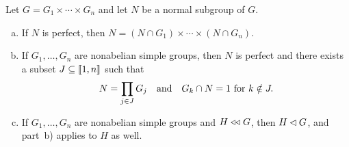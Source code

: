 \begin{thm}\label{semisimple-normal}
    Let\/ $G = G_1 \times \cdots \times G_n$ and let\/ $N$ be a normal subgroup of\/ $G$.
    \begin{enumerate}[a),font=\upshape]
    \item If\/ $N$ is perfect, then\/ $N = (N \cap G_1) \times \cdots \times (N \cap G_n)$.
    \item If\/ $G_1, \dots, G_n$ are nonabelian simple groups, then\/ $N$ is perfect and there exists a subset\/ $J \subseteq \llbracket1,n\rrbracket$ such that
    $$
        N = \prod_{j \in J} G_j\quad\text{\upshape and}\quad G_k \cap N = 1\text{\upshape\ for }k \notin J.
    $$
    \item If\/ $G_1, \dots, G_n$ are nonabelian simple groups and\/ $H\mathrel{\triangleleft\triangleleft} G$, then\/ $H\lhd G$, and part\/~{\upshape b)} applies to\/ $H$ as well.
    \end{enumerate}
\end{thm}

